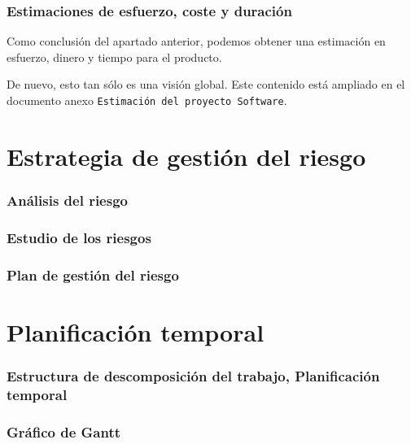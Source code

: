\documentclass[spanish,a4paper,12pt]{report}	%
\begin{document}
	\section{Estimaciones de esfuerzo, coste y duración}
	Como conclusión del apartado anterior, podemos obtener una estimación en esfuerzo, dinero y tiempo para el producto.


	De nuevo, esto tan sólo es una visión global. Este contenido está ampliado en el documento anexo \texttt{Estimación del proyecto Software}.


\newpage
\mbox{}
\thispagestyle{empty}						%
\newpage
\setcounter{section}{0}

\part{Estrategia de gestión del riesgo}

	\section{Análisis del riesgo}

	\section{Estudio de los riesgos}

	\section{Plan de gestión del riesgo}

\newpage
\mbox{}
\thispagestyle{empty}						%
\newpage
\setcounter{section}{0}

\part{Planificación temporal}

	\section{Estructura de descomposición del trabajo, Planificación temporal}

	\section{Gráfico de  Gantt}
\end{document}

